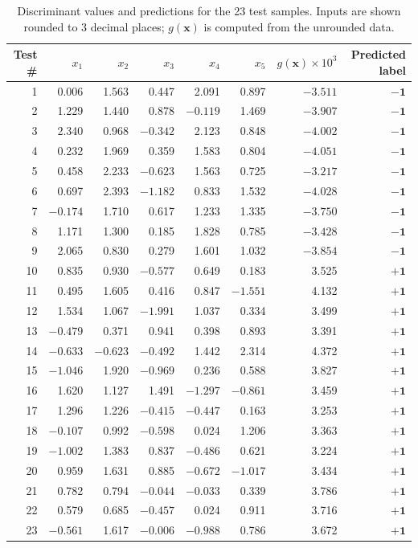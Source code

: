 \begin{table}[htbp]
\centering
\footnotesize
\caption{Discriminant values and predictions for the 23 test samples. Inputs are shown rounded to 3 decimal places;
$g(\mathbf{x})$ is computed from the unrounded data.}
\begin{tabular}{@{}rrrrrrrr@{}}
\toprule
Test \# & $x_1$ & $x_2$ & $x_3$ & $x_4$ & $x_5$ & $g(\mathbf{x})\times10^{3}$ & Predicted label \\
\midrule
1 & 0.006 & 1.563 & 0.447 & 2.091 & 0.897 & $-3.511$ & $\mathbf{-1}$ \\
2 & 1.229 & 1.440 & 0.878 & $-0.119$ & 1.469 & $-3.907$ & $\mathbf{-1}$ \\
3 & 2.340 & 0.968 & $-0.342$ & 2.123 & 0.848 & $-4.002$ & $\mathbf{-1}$ \\
4 & 0.232 & 1.969 & 0.359 & 1.583 & 0.804 & $-4.051$ & $\mathbf{-1}$ \\
5 & 0.458 & 2.233 & $-0.623$ & 1.563 & 0.725 & $-3.217$ & $\mathbf{-1}$ \\
6 & 0.697 & 2.393 & $-1.182$ & 0.833 & 1.532 & $-4.028$ & $\mathbf{-1}$ \\
7 & $-0.174$ & 1.710 & 0.617 & 1.233 & 1.335 & $-3.750$ & $\mathbf{-1}$ \\
8 & 1.171 & 1.300 & 0.185 & 1.828 & 0.785 & $-3.428$ & $\mathbf{-1}$ \\
9 & 2.065 & 0.830 & 0.279 & 1.601 & 1.032 & $-3.854$ & $\mathbf{-1}$ \\
10 & 0.835 & 0.930 & $-0.577$ & 0.649 & 0.183 & 3.525 & $\mathbf{+1}$ \\
11 & 0.495 & 1.605 & 0.416 & 0.847 & $-1.551$ & 4.132 & $\mathbf{+1}$ \\
12 & 1.534 & 1.067 & $-1.991$ & 1.037 & 0.334 & 3.499 & $\mathbf{+1}$ \\
13 & $-0.479$ & 0.371 & 0.941 & 0.398 & 0.893 & 3.391 & $\mathbf{+1}$ \\
14 & $-0.633$ & $-0.623$ & $-0.492$ & 1.442 & 2.314 & 4.372 & $\mathbf{+1}$ \\
15 & $-1.046$ & 1.920 & $-0.969$ & 0.236 & 0.588 & 3.827 & $\mathbf{+1}$ \\
16 & 1.620 & 1.127 & 1.491 & $-1.297$ & $-0.861$ & 3.459 & $\mathbf{+1}$ \\
17 & 1.296 & 1.226 & $-0.415$ & $-0.447$ & 0.163 & 3.253 & $\mathbf{+1}$ \\
18 & $-0.107$ & 0.992 & $-0.598$ & 0.024 & 1.206 & 3.363 & $\mathbf{+1}$ \\
19 & $-1.002$ & 1.383 & 0.837 & $-0.486$ & 0.621 & 3.224 & $\mathbf{+1}$ \\
20 & 0.959 & 1.631 & 0.885 & $-0.672$ & $-1.017$ & 3.434 & $\mathbf{+1}$ \\
21 & 0.782 & 0.794 & $-0.044$ & $-0.033$ & 0.339 & 3.786 & $\mathbf{+1}$ \\
22 & 0.579 & 0.685 & $-0.457$ & 0.024 & 0.911 & 3.716 & $\mathbf{+1}$ \\
23 & $-0.561$ & 1.617 & $-0.006$ & $-0.988$ & 0.786 & 3.672 & $\mathbf{+1}$ \\
\bottomrule
\end{tabular}
\end{table}

